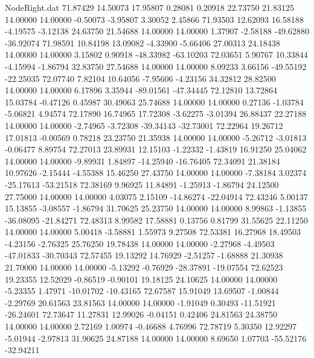 \begin{filecontents}{NodeRight.dat}
  71.87429   14.50073   17.95807     0.28081    0.20918   22.73750   21.83125   14.00000   14.00000   -0.50073   -3.95807    3.30052    2.45866
  71.93503   12.62093   16.58188    -4.19575   -3.12138   24.63750   21.54688   14.00000   14.00000    1.37907   -2.58188  -49.62880  -36.92074
  71.98591   10.84198   13.09082    -4.33900   -5.66406   27.00313   24.18438   14.00000   14.00000    3.15802    0.90918  -48.33982  -63.10203
  72.03651    5.90767   10.33844    -4.15994   -1.86794   32.83750   27.54688   14.00000   14.00000    8.09233    3.66156  -49.55192  -22.25035
  72.07740    7.82104   10.64056    -7.95606   -4.23156   34.32812   28.82500   14.00000   14.00000    6.17896    3.35944  -89.01561  -47.34445
  72.12810   13.72864   15.03784    -0.47126    0.45987   30.49063   25.74688   14.00000   14.00000    0.27136   -1.03784   -5.06821    4.94574
  72.17890   16.74965   17.72308    -3.62275   -3.01394   26.88437   22.27188   14.00000   14.00000   -2.74965   -3.72308  -39.34143  -32.73001
  72.22964   19.26712   17.01813    -0.00569    0.78218   23.23750   21.35938   14.00000   14.00000   -5.26712   -3.01813   -0.06477    8.89754
  72.27013   23.89931   12.15103    -1.22332   -1.43819   16.91250   25.04062   14.00000   14.00000   -9.89931    1.84897  -14.25940  -16.76405
  72.34091   21.38184   10.97626    -2.15444   -4.55388   15.46250   27.43750   14.00000   14.00000   -7.38184    3.02374  -25.17613  -53.21518
  72.38169    9.96925   11.84891    -1.25913   -1.86794   24.12500   27.75000   14.00000   14.00000    4.03075    2.15109  -14.86274  -22.04914
  72.43246    5.00137   15.13855    -3.08557   -1.86794   31.70625   25.23750   14.00000   14.00000    8.99863   -1.13855  -36.08095  -21.84271
  72.48313    8.99582   17.58881     0.13756    0.81799   31.55625   22.11250   14.00000   14.00000    5.00418   -3.58881    1.55973    9.27508
  72.53381   16.27968   18.49503    -4.23156   -2.76325   25.76250   19.78438   14.00000   14.00000   -2.27968   -4.49503  -47.01833  -30.70343
  72.57455   19.13292   14.76929    -2.51257   -1.68888   21.30938   21.70000   14.00000   14.00000   -5.13292   -0.76929  -28.37891  -19.07554
  72.62523   19.23355   12.52029    -0.86519   -0.90101   19.18125   24.10625   14.00000   14.00000   -5.23355    1.47971  -10.01702  -10.43165
  72.67587   15.91049   13.69507    -1.00844   -2.29769   20.61563   23.81563   14.00000   14.00000   -1.91049    0.30493  -11.51921  -26.24601
  72.73647   11.27831   12.99026    -0.04151    0.42406   24.81563   24.38750   14.00000   14.00000    2.72169    1.00974   -0.46688    4.76996
  72.78719    5.30350   12.92297    -5.01944   -2.97813   31.90625   24.87188   14.00000   14.00000    8.69650    1.07703  -55.52176  -32.94211

\end{filecontents}
